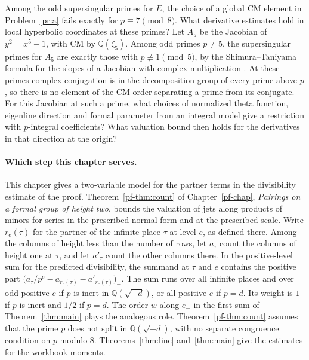 \documentclass[reqno]{amsart}
\newcounter{chap}
\theoremstyle{definition}
\theoremstyle{plain}
\newcommand{\Q}{\mathbb{Q}}
\begin{document}
Among the odd supersingular primes for \(E\), the choice of a global CM element in Problem~\ref{pr:a} fails exactly for \(p \equiv 7 \pmod 8\).  What derivative estimates hold in local hyperbolic coordinates at these primes?  Let \(A_5\) be the Jacobian of \(y^2 = x^5 - 1\), with CM by \(\Q(\zeta_5)\).  Among odd primes \(p \ne 5\), the supersingular primes for \(A_5\) are exactly those with \(p \not\equiv 1 \pmod 5\), by the Shimura--Taniyama formula for the slopes of a Jacobian with complex multiplication \cite{LMPT}.  At these primes complex conjugation is in the decomposition group of every prime above \(p\), so there is no element of the CM order separating a prime from its conjugate.  For this Jacobian at such a prime, what choices of normalized theta function, eigenline direction and formal parameter from an integral model give a restriction with \(p\)-integral coefficients?  What valuation bound then holds for the derivatives in that direction at the origin?

\paragraph{Which step this chapter serves.}
This chapter gives a two-variable model for the partner terms in the divisibility estimate of the proof.  Theorem~\ref{pf-thm:count} of Chapter~\ref{pf-chap}, \emph{Pairings on a formal group of height two}, bounds the valuation of jets along products of minors for series in the prescribed normal form and at the prescribed scale.  Write \(r_e(\tau)\) for the partner of the infinite place \(\tau\) at level \(e\), as defined there.  Among the columns of height less than the number of rows, let \(a_\tau\) count the columns of height one at \(\tau\), and let \(a'_\tau\) count the other columns there.  In the positive-level sum for the predicted divisibility, the summand at \(\tau\) and \(e\) contains the positive part \(\bigl(a_\tau/p^e - a_{r_e(\tau)} - a'_{r_e(\tau)}\bigr)_+\).  The sum runs over all infinite places and over odd positive \(e\) if \(p\) is inert in \(\Q(\sqrt{-d})\), or all positive \(e\) if \(p = d\).  Its weight is \(1\) if \(p\) is inert and \(1/2\) if \(p = d\).  The order \(w\) along \(e_-\) in the first sum of Theorem~\ref{thm:main} plays the analogous role.  Theorem~\ref{pf-thm:count} assumes that the prime \(p\) does not split in \(\Q(\sqrt{-d})\), with no separate congruence condition on \(p\) modulo \(8\).  Theorems~\ref{thm:line} and~\ref{thm:main} give the estimates for the workbook moments.
\end{document}

